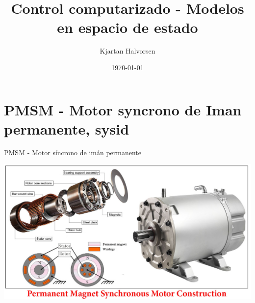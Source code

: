 \documentclass[presentation,aspectratio=1610]{beamer}
\author{Kjartan Halvorsen}
\date{\today}
\title{Control computarizado - Modelos en espacio de estado}
\begin{document}
\maketitle

\section{PMSM - Motor syncrono de Iman permanente, sysid}
\label{sec:org75c5f79}


\begin{frame}[label={sec:org504525b}]{PMSM - Motor síncrono de imán permanente}
\begin{center}
\includegraphics[width=0.9\linewidth]{../../figures/permanent-motor.jpg}
\end{center}
\end{frame}
\end{document}

